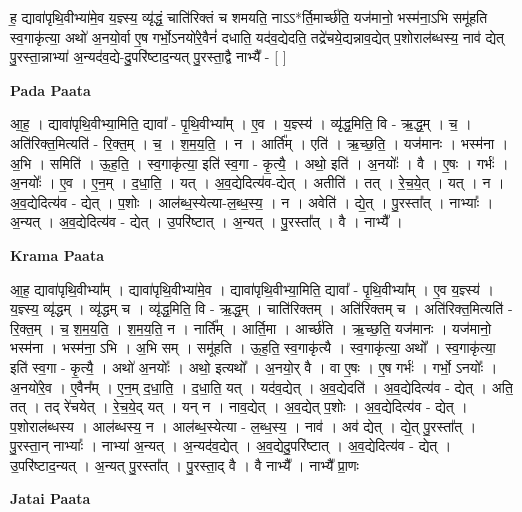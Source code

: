 \documentclass[17pt]{extarticle}
\begin{document}
ह॒ द्यावा॑पृथि॒वीभ्या॑मे॒व य॒ज्ञ्स्य॒ व्यृ॑द्धं॒ चाति॑रिक्तं च शमयति॒ नाऽऽ*र्ति॒मार्च्छ॑ति॒ यज॑मानो॒ भस्म॑ना॒ऽभि समू॑हति स्व॒गाकृ॑त्या॒ अथो॑ अ॒नयो॒र्वा ए॒ष गर्भो॒ऽनयो॑रे॒वैनं॑ दधाति॒ यद॑व॒द्येदति॒ तद्रे॑चये॒द्यन्नाव॒द्येत् प॒शोराल॑ब्धस्य॒ नाव॑ द्येत् पु॒रस्ता॒न्नाभ्या॑ अ॒न्यद॑व॒द्ये-दु॒परि॑ष्टाद॒न्यत् पु॒रस्ता॒द्वै नाभ्यै᳚ - [  ] \newline

\textbf{Pada Paata} \newline

आ॒ह॒ । द्यावा॑पृथि॒वीभ्या॒मिति॒ द्यावा᳚ - पृ॒थि॒वीभ्या᳚म् । ए॒व । य॒ज्ञ्स्य॑ । व्यृ॑द्ध॒मिति॒ वि - ऋ॒द्ध॒म् । च॒ । अति॑रिक्त॒मित्यति॑ - रि॒क्त॒म् । च॒ । श॒म॒य॒ति॒ । न । आर्ति᳚म् । एति॑ । ऋ॒च्छ॒ति॒ । यज॑मानः । भस्म॑ना । अ॒भि । समिति॑ । ऊ॒ह॒ति॒ । स्व॒गाकृ॑त्या॒ इति॑ स्व॒गा - कृ॒त्यै॒ । अथो॒ इति॑ । अ॒नयोः᳚ । वै । ए॒षः । गर्भः॑ । अ॒नयोः᳚ । ए॒व । ए॒न॒म् । द॒धा॒ति॒ । यत् । अ॒व॒द्येदित्य॑व-द्येत् । अतीति॑ । तत् । रे॒च॒ये॒त् । यत् । न । अ॒व॒द्येदित्य॑व - द्येत् । प॒शोः । आल॑ब्ध॒स्येत्या-ल॒ब्ध॒स्य॒ । न । अवेति॑ । द्ये॒त् । पु॒रस्ता᳚त् । नाभ्याः᳚ । अ॒न्यत् । अ॒व॒द्येदित्य॑व - द्येत् । उ॒परि॑ष्टात् । अ॒न्यत् । पु॒रस्ता᳚त् । वै । नाभ्यै᳚ ।  \newline


\textbf{Krama Paata} \newline

आ॒ह॒ द्यावा॑पृथि॒वीभ्या᳚म् । द्यावा॑पृथि॒वीभ्या॑मे॒व । द्यावा॑पृथि॒वीभ्या॒मिति॒ द्यावा᳚ - पृ॒थि॒वीभ्या᳚म् । ए॒व य॒ज्ञ्स्य॑ । य॒ज्ञ्स्य॒ व्यृ॑द्धम् । व्यृ॑द्धम् च । व्यृ॑द्ध॒मिति॒ वि - ऋ॒द्ध॒म् । चाति॑रिक्तम् । अति॑रिक्तम् च । अति॑रिक्त॒मित्यति॑ - रि॒क्त॒म् । च॒ श॒म॒य॒ति॒ । श॒म॒य॒ति॒ न । नार्ति᳚म् । आर्ति॒मा । आर्च्छ॑ति । ऋ॒च्छ॒ति॒ यज॑मानः । यज॑मानो॒ भस्म॑ना । भस्म॑ना॒ ऽभि । अ॒भि सम् । समू॑हति । ऊ॒ह॒ति॒ स्व॒गाकृ॑त्यै । स्व॒गाकृ॑त्या॒ अथो᳚ । स्व॒गाकृ॑त्या॒ इति॑ स्व॒गा - कृ॒त्यै॒ । अथो॑ अ॒नयोः᳚ । अथो॒ इत्यथो᳚ । अ॒नयो॒र् वै । वा ए॒षः । ए॒ष गर्भः॑ । गर्भो॒ ऽनयोः᳚ । अ॒नयो॑रे॒व । ए॒वैन᳚म् । ए॒न॒म् द॒धा॒ति॒ । द॒धा॒ति॒ यत् । यद॑व॒द्येत् । अ॒व॒द्येदति॑ । अ॒व॒द्येदित्य॑व - द्येत् । अति॒ तत् । तद् रे॑चयेत् । रे॒च॒ये॒द् यत् । यन् न । नाव॒द्येत् । अ॒व॒द्येत् प॒शोः । अ॒व॒द्येदित्य॑व - द्येत् । प॒शोराल॑ब्धस्य । आल॑ब्धस्य॒ न । आल॑ब्ध॒स्येत्या - ल॒ब्ध॒स्य॒ । नाव॑ । 
अव॑ द्येत् । द्ये॒त् पु॒रस्ता᳚त् । पु॒रस्ता॒न् नाभ्याः᳚ । नाभ्या॑ अ॒न्यत् । अ॒न्यद॑व॒द्येत् । अ॒व॒द्येदु॒परि॑ष्टात् । अ॒व॒द्येदित्य॑व - द्येत् । उ॒परि॑ष्टाद॒न्यत् । अ॒न्यत् पु॒रस्ता᳚त् । पु॒रस्ता॒द् वै । वै नाभ्यै᳚ । नाभ्यै᳚ प्रा॒णः \newline

\textbf{Jatai Paata} \newline
\end{document}
